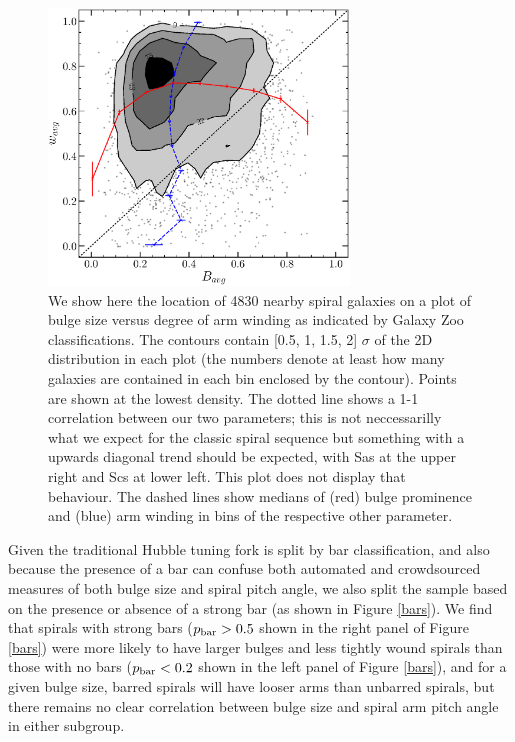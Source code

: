 \documentclass[usenatbib]{mn2e}
\begin{document}
 
 \begin{figure}
\includegraphics[width=80mm]{Figure5.ps}
\caption{We show here the location of {4830} nearby spiral galaxies on a plot of bulge size versus degree of arm winding as indicated by Galaxy Zoo classifications. The contours contain [0.5, 1, 1.5, 2] $\sigma$ of the 2D distribution in each plot (the numbers denote at least how many galaxies are contained in each bin enclosed by the contour). Points are shown at the lowest density.  The dotted line shows a 1-1 correlation between our two parameters; this is not neccessarilly what we expect for the classic spiral sequence but something with a upwards diagonal trend should be expected, with Sas at the upper right and Scs at lower left. This plot does not display that behaviour. The dashed lines show medians of (red) bulge prominence and (blue) arm winding in bins of the respective other parameter.  \label{bulgewinding}}
\end{figure}
 
 Given the traditional Hubble tuning fork is split by bar classification, and also because the presence of a bar can confuse both automated and crowdsourced measures of both bulge size and spiral pitch angle, we also split the sample based on the presence or absence of a strong bar (as shown in Figure \ref{bars}). We find that spirals with strong bars ($p_{\rm bar}>0.5$ shown in the right panel of Figure \ref{bars}) were more likely to have larger bulges and less tightly wound spirals than those with no bars ($p_{\rm bar} < 0.2$ shown in the left panel of Figure \ref{bars}), and for a given bulge size, barred spirals will have looser arms than unbarred spirals, but there remains no clear correlation between bulge size and spiral arm pitch angle in either subgroup.  
  
\end{document}
